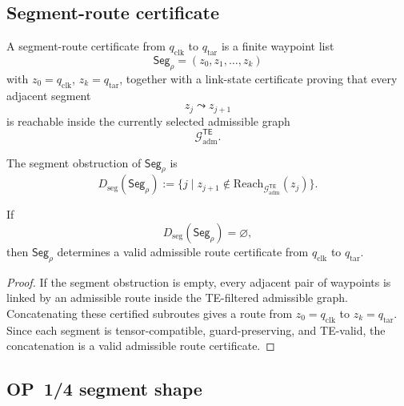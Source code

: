 \subsection{Segment-route certificate}
\label{subsec:v410r15-segment-route-certificate}

\begin{definition}
\label{def:v410r15-segment-route-certificate}
A segment-route certificate from \(q_{\mathrm{clk}}\) to \(q_{\mathrm{tar}}\)
is a finite waypoint list
\[
 \mathsf{Seg}_{\rho}
 =
 (z_0,z_1,\ldots,z_k)
\]
with \(z_0=q_{\mathrm{clk}}\), \(z_k=q_{\mathrm{tar}}\), together with a
link-state certificate proving that every adjacent segment
\[
 z_j\leadsto z_{j+1}
\]
is reachable inside the currently selected admissible graph
\[
 \mathcal G_{\mathrm{adm}}^{\mathsf{TE}}.
\]
\end{definition}

\begin{definition}
\label{def:v410r15-segment-obstruction}
The segment obstruction of \(\mathsf{Seg}_{\rho}\) is
\[
 D_{\mathrm{seg}}(\mathsf{Seg}_{\rho})
 :=
 \{j\mid
 z_{j+1}\notin
 \mathrm{Reach}_{\mathcal G_{\mathrm{adm}}^{\mathsf{TE}}}(z_j)\}.
\]
\end{definition}

\begin{lemma}
\label{lem:v410r15-segment-certificate-implies-route-certificate}
If
\[
 D_{\mathrm{seg}}(\mathsf{Seg}_{\rho})=\varnothing,
\]
then \(\mathsf{Seg}_{\rho}\) determines a valid admissible route certificate
from \(q_{\mathrm{clk}}\) to \(q_{\mathrm{tar}}\).
\end{lemma}

\begin{proof}
If the segment obstruction is empty, every adjacent pair of waypoints is linked
by an admissible route inside the TE-filtered admissible graph. Concatenating
these certified subroutes gives a route from \(z_0=q_{\mathrm{clk}}\) to
\(z_k=q_{\mathrm{tar}}\). Since each segment is tensor-compatible,
guard-preserving, and TE-valid, the concatenation is a valid admissible route
certificate.
\end{proof}

\subsection{OP~1/4 segment shape}
\label{subsec:v410r15-op14-segment-shape}

